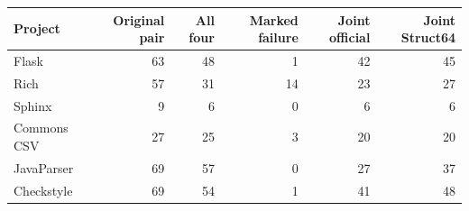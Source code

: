 \begin{tabular}{lrrrrr}
\toprule
Project & Original pair & All four & Marked failure & Joint official & Joint Struct64 \\
\midrule
Flask & 63 & 48 & 1 & 42 & 45 \\
Rich & 57 & 31 & 14 & 23 & 27 \\
Sphinx & 9 & 6 & 0 & 6 & 6 \\
Commons CSV & 27 & 25 & 3 & 20 & 20 \\
JavaParser & 69 & 57 & 0 & 27 & 37 \\
Checkstyle & 69 & 54 & 1 & 41 & 48 \\
\bottomrule
\end{tabular}
